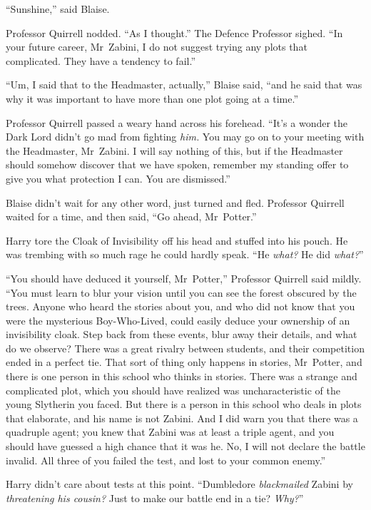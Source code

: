 “Sunshine,” said Blaise.

Professor Quirrell nodded. “As I thought.” The Defence Professor sighed. “In
your future career, Mr~Zabini, I do not suggest trying any plots that
complicated. They have a tendency to fail.”

“Um, I said that to the Headmaster, actually,” Blaise said, “and he said that
was why it was important to have more than one plot going at a time.”

Professor Quirrell passed a weary hand across his forehead. “It’s a wonder the
Dark Lord didn’t go mad from fighting \emph{him.} You may go on to your meeting
with the Headmaster, Mr~Zabini. I will say nothing of this, but if the
Headmaster should somehow discover that we have spoken, remember my standing
offer to give you what protection I can. You are dismissed.”

Blaise didn’t wait for any other word, just turned and fled.
\later
Professor Quirrell waited for a time, and then said, “Go ahead, Mr~Potter.”

Harry tore the Cloak of Invisibility off his head and stuffed into his pouch.
He was trembing with so much rage he could hardly speak. “He \emph{what?} He
did \emph{what?}”

“You should have deduced it yourself, Mr~Potter,” Professor Quirrell said
mildly. “You must learn to blur your vision until you can see the forest
obscured by the trees. Anyone who heard the stories about you, and who did not
know that you were the mysterious Boy-Who-Lived, could easily deduce your
ownership of an invisibility cloak. Step back from these events, blur away
their details, and what do we observe? There was a great rivalry between
students, and their competition ended in a perfect tie. That sort of thing only
happens in stories, Mr~Potter, and there is one person in this school who
thinks in stories. There was a strange and complicated plot, which you should
have realized was uncharacteristic of the young Slytherin you faced. But there
is a person in this school who deals in plots that elaborate, and his name is
not Zabini. And I did warn you that there was a quadruple agent; you knew that
Zabini was at least a triple agent, and you should have guessed a high chance
that it was he. No, I will not declare the battle invalid. All three of you
failed the test, and lost to your common enemy.”

Harry didn’t care about tests at this point. “Dumbledore \emph{blackmailed}
Zabini by \emph{threatening his cousin?} Just to make our battle end in a tie?
\emph{Why?}”


